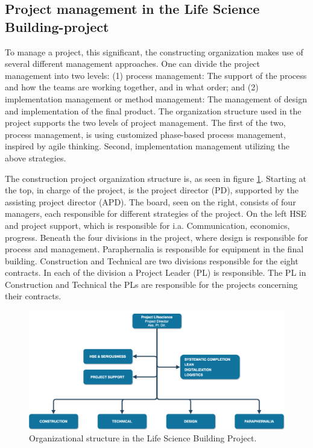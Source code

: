\subsection{Project management in the Life Science Building-project}
To manage a project, this significant, the constructing organization makes use of several different management approaches. One can divide the project management into two levels: (1) process management: The support of the process and how the teams are working together, and in what order; and (2) implementation management or method management: The management of design and implementation of the final product. The organization structure used in the project supports the two levels of project management. The first of the two, process management, is using customized phase-based process management, inspired by agile thinking. Second, implementation management utilizing the above strategies. 

The construction project organization structure is, as seen in figure \ref{fig:project_structure}. Starting at the top, in charge of the project, is the project director (PD), supported by the assisting project director (APD). The board, seen on the right, consists of four managers, each responsible for different strategies of the project. On the left HSE and project support, which is responsible for i.a. Communication, economics, progress. Beneath the four divisions in the project, where design is responsible for process and management. Paraphernalia is responsible for equipment in the final building. Construction and Technical are two divisions responsible for the eight contracts. In each of the division a Project Leader (PL) is responsible. The PL in Construction and Technical the PLs are responsible for the projects concerning their contracts.

\begin{figure}
    \centering
    \includegraphics[width=\textwidth]{fig/lvb_diagram.png}
    \caption{Organizational structure in the Life Science Building Project.}
    \label{fig:project_structure}
\end{figure}


